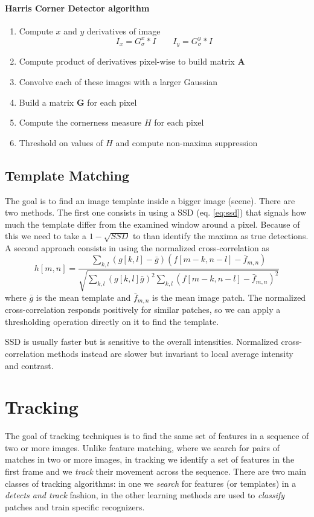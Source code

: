 \documentclass[a4paper,twocolumn]{article}
\begin{document}
\paragraph{Harris Corner Detector algorithm}
\begin{enumerate}
	\item Compute $x$ and $y$ derivatives of image
		$$I_x=G_{\sigma}^x * I \qquad I_y = G_{\sigma}^y * I$$
	\item Compute product of derivatives pixel-wise to build matrix $\mathbf{A}$
	\item Convolve each of these images with a larger Gaussian
	\item Build a matrix $\mathbf{G}$ for each pixel
	\item Compute the cornerness measure $H$ for each pixel
	\item Threshold on values of $H$ and compute non-maxima suppression
\end{enumerate}


\subsection{Template Matching}
The goal is to find an image template inside a bigger image (scene). There are
two methods. The first one consists in using a SSD (eq. \ref{eq:ssd}) that signals how much the
template differ from the examined window around a pixel. Because of this we need
to take a $1 - \sqrt{SSD}$ to than identify the maxima as true detections.
A second approach consists in using the normalized cross-correlation as
\begin{equation}
	h[m,n]=\frac{\sum_{k,l}(g[k,l]-\bar{g})(f[m-k,n-l]-\bar{f}_{m,n})}
		{\sqrt{\sum_{k,l}(g[k,l]\bar{g})^2\sum_{k,l}(f[m-k,n-l]-\bar{f}_{m,n})^2}}
\end{equation}
where $\bar{g}$ is the mean template and $\bar{f}_{m,n}$ is the mean image patch.
The normalized cross-correlation responds positively for similar patches, so we
can apply a thresholding operation directly on it to find the template.

SSD is usually faster but is sensitive to the overall intensities. Normalized
cross-correlation methods instead are slower but invariant to local average
intensity and contrast.



\section{Tracking}
The goal of tracking techniques is to find the same set of features in a
sequence of two or more images. Unlike feature matching, where we search for
pairs of matches in two or more images, in tracking we identify a set of
features in the first frame and we \textit{track} their movement across the
sequence. There are two main classes of tracking algorithms: in one we
\textit{search} for features (or templates) in a \textit{detects and track}
fashion, in the other learning methods are used to \textit{classify} patches and
train specific recognizers.
\end{document}
